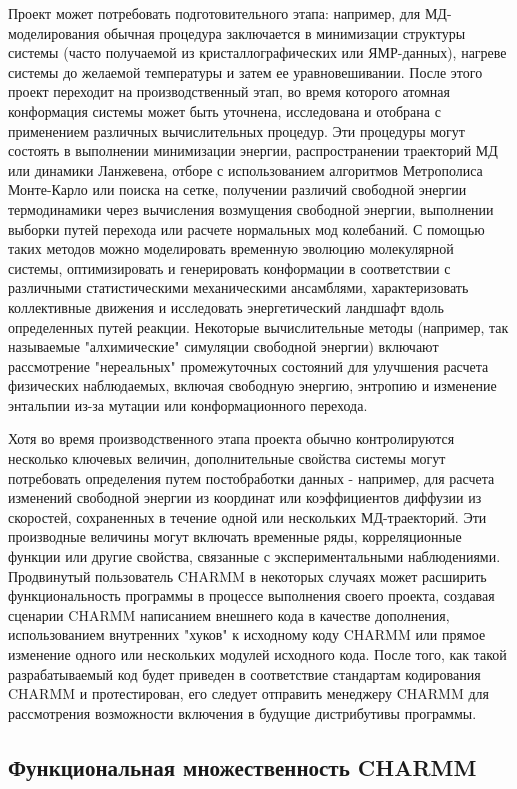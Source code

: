 Проект может потребовать подготовительного этапа: например, для МД-моделирования обычная процедура заключается в минимизации структуры системы (часто получаемой из кристаллографических или ЯМР-данных), нагреве системы до желаемой температуры и затем ее уравновешивании. После этого проект переходит на производственный этап, во время которого атомная конформация системы может быть уточнена, исследована и отобрана с применением различных вычислительных процедур. Эти процедуры могут состоять в выполнении минимизации энергии, распространении траекторий МД или динамики Ланжевена, отборе с использованием алгоритмов Метрополиса Монте-Карло или поиска на сетке, получении различий свободной энергии термодинамики через вычисления возмущения свободной энергии, выполнении выборки путей перехода или расчете нормальных мод колебаний. С помощью таких методов можно моделировать временную эволюцию молекулярной системы, оптимизировать и генерировать конформации в соответствии с различными статистическими механическими ансамблями, характеризовать коллективные движения и исследовать энергетический ландшафт вдоль определенных путей реакции. Некоторые вычислительные методы (например, так называемые "алхимические" симуляции свободной энергии) включают рассмотрение "нереальных" промежуточных состояний для улучшения расчета физических наблюдаемых, включая свободную энергию, энтропию и изменение энтальпии из-за мутации или конформационного перехода.

Хотя во время производственного этапа проекта обычно контролируются несколько ключевых величин, дополнительные свойства системы могут потребовать определения путем постобработки данных - например, для расчета изменений свободной энергии из координат или коэффициентов диффузии из скоростей, сохраненных в течение одной или нескольких МД-траекторий. Эти производные величины могут включать временные ряды, корреляционные функции или другие свойства, связанные с экспериментальными наблюдениями. Продвинутый пользователь CHARMM в некоторых случаях может расширить функциональность программы в процессе выполнения своего проекта, создавая сценарии CHARMM написанием внешнего кода в качестве дополнения, использованием внутренних "хуков" к исходному коду CHARMM или прямое изменение одного или нескольких модулей исходного кода. После того, как такой разрабатываемый код будет приведен в соответствие стандартам кодирования CHARMM и протестирован, его следует отправить менеджеру CHARMM для рассмотрения возможности включения в будущие дистрибутивы программы.

\subsection{Функциональная множественность CHARMM}

